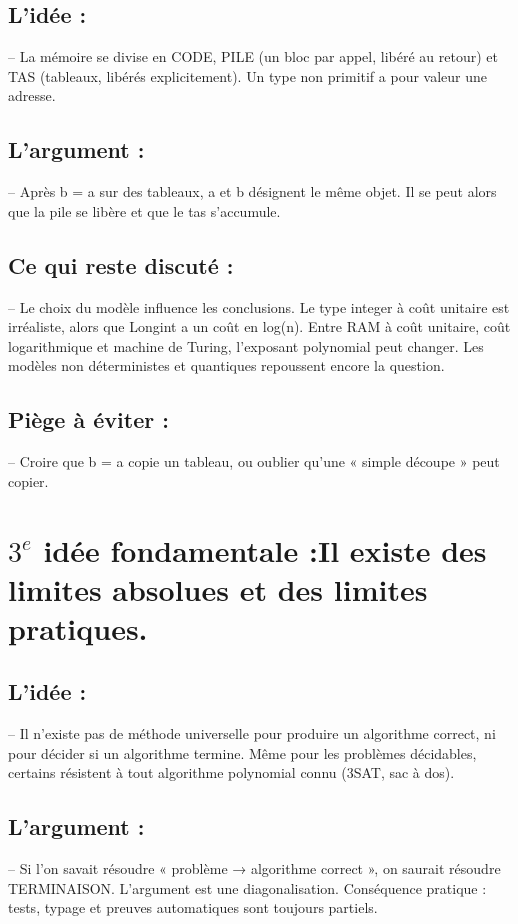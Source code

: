 \documentclass{article}
\begin{document}
\subsection*{\textbf{L'idée} :}
\qquad -- La mémoire se divise en CODE, PILE (un bloc par appel, libéré au retour) et TAS (tableaux, libérés explicitement). Un type non primitif a pour valeur une adresse.


\subsection*{\textbf{L'argument} :}
\qquad -- Après b = a sur des tableaux, a et b désignent le même objet. Il se peut alors que la pile se libère et que le tas s'accumule.


\subsection*{\textbf{Ce qui reste discuté} :}
\qquad -- Le choix du modèle influence les conclusions. Le type integer à coût unitaire est irréaliste, alors que Longint a un coût en log(n). Entre RAM à coût unitaire, coût logarithmique et machine de Turing, l'exposant polynomial peut changer. Les modèles non déterministes et quantiques repoussent encore la question.


\subsection*{\textbf{Piège à éviter} :}
\qquad -- Croire que b = a copie un tableau, ou oublier qu'une « simple découpe » peut copier.


\section*{\textbf{$3^e$ idée fondamentale} :Il existe des limites absolues et des limites pratiques.}

\subsection*{\textbf{L'idée} :}
\qquad -- Il n'existe pas de méthode universelle pour produire un algorithme correct, ni pour décider si un algorithme termine. Même pour les problèmes décidables, certains résistent à tout algorithme polynomial connu (3SAT, sac à dos).


\subsection*{\textbf{L'argument} :}
\qquad -- Si l'on savait résoudre « problème → algorithme correct », on saurait résoudre TERMINAISON. L'argument est une diagonalisation. Conséquence pratique : tests, typage et preuves automatiques sont toujours partiels.
\end{document}
